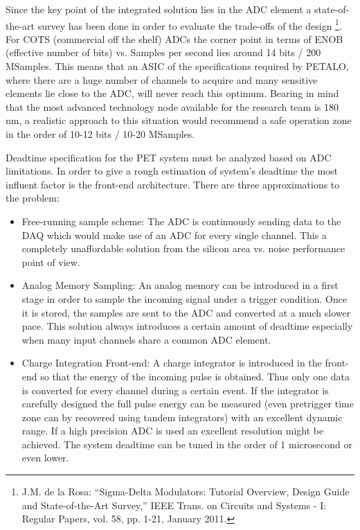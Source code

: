 Since the key point of the integrated solution lies in the ADC element a state-of-the-art survey has been done in order to evaluate the trade-offs of the design \footnote{J.M. de la Rosa: “Sigma-Delta Modulators: Tutorial Overview, Design Guide and State-of-the-Art Survey,” IEEE Trans. on Circuits and Systems - I: Regular Papers, vol. 58, pp. 1-21, January 2011.}. For COTS (commercial off the shelf) ADCs the corner point in terms of ENOB (effective number of bits) vs. Samples per second lies around 14 bits / 200 MSamples. This means that an ASIC of the specifications required by PETALO, where there are a huge number of channels to acquire and many sensitive elements lie close to the ADC, will never reach this optimum. Bearing in mind that the most advanced technology node available for the research team is 180 nm, a realistic approach to this situation would recommend a safe operation zone in the order of 10-12 bits / 10-20 MSamples.
 
Deadtime specification for the PET system must be analyzed based on ADC limitations. In order to give a rough estimation of system's deadtime the most influent factor is the front-end architecture. There are three approximations to the problem:
\begin{itemize}
   \item Free-running sample scheme: The ADC is continuously sending data to the DAQ which would make use of an ADC for every single channel. This a completely unaffordable solution from the silicon area vs. noise performance point of view.
   \item Analog Memory Sampling: An analog memory can be introduced in a first stage in order to sample the incoming signal under a trigger condition. Once it is stored, the samples are sent to the ADC and converted at a much slower pace. This solution always introduces a certain amount of deadtime especially when many input channels share a common ADC element.
   \item Charge Integration Front-end: A charge integrator is introduced in the front-end so that the energy of the incoming pulse is obtained. Thus only one data is converted for every channel during a certain event. If the integrator is carefully designed the full pulse energy can be measured (even pretrigger time zone can by recovered using tandem integrators) with an excellent dynamic range. If a high precision ADC is used an excellent resolution might be achieved. The system deadtime can be tuned in the order of 1 microsecond or even lower.
\end{itemize}
 
